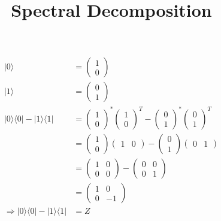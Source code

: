 \documentclass{article}
\begin{document}
\title{Spectral Decomposition}

\begin{equation}
    \begin{split}
        |0\rangle & = \begin{pmatrix} 1 \\ 0 \end{pmatrix} \\
        |1\rangle & = \begin{pmatrix} 0 \\ 1 \end{pmatrix} \\
        |0\rangle\langle0| - |1\rangle\langle1| & = 
            \begin{pmatrix} 1 \\ 0 \end{pmatrix}^*
            \begin{pmatrix} 1 \\ 0 \end{pmatrix}^T
            - \begin{pmatrix} 0 \\ 1 \end{pmatrix}^*
            \begin{pmatrix} 0 \\ 1 \end{pmatrix}^T \\
        & = \begin{pmatrix} 1 \\ 0 \end{pmatrix}
            \begin{pmatrix} 1 & 0 \end{pmatrix}
            - \begin{pmatrix} 0 \\ 1 \end{pmatrix}
            \begin{pmatrix} 0 & 1 \end{pmatrix} \\
        & = \begin{pmatrix} 1 & 0 \\ 0 & 0 \end{pmatrix}
            - \begin{pmatrix} 0 & 0 \\ 0 & 1 \end{pmatrix} \\
        & = \begin{pmatrix} 1 & 0 \\ 0 & -1 \end{pmatrix} \\
        \Longrightarrow |0\rangle\langle0| - |1\rangle\langle1| & = Z
    \end{split}
\end{equation}
\end{document}
